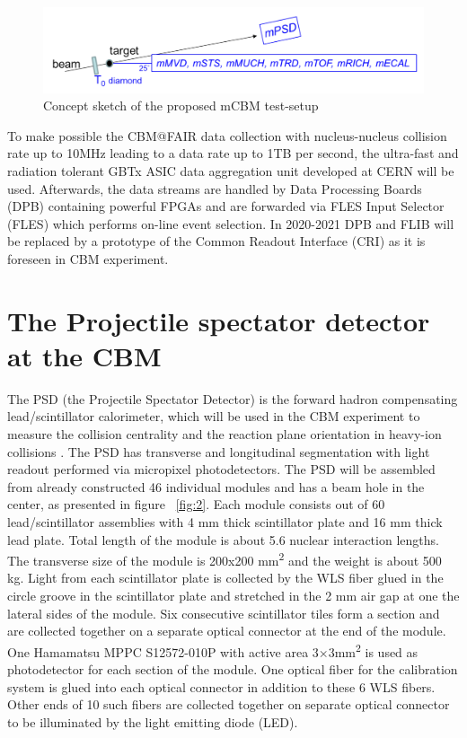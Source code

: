 \documentclass[a4paper,11pt]{article}
\begin{document}
\begin{figure}[htbp]
	\centering 
	\includegraphics[width=.8\textwidth]{mCBM_sketch.png}
	\caption{\label{fig:1} Concept sketch of the proposed mCBM test-setup}
\end{figure}

To make possible the CBM@FAIR data collection with nucleus-nucleus collision rate up to 10MHz leading to a data rate up to 1TB per second, the ultra-fast and radiation tolerant GBTx ASIC data aggregation unit developed at CERN will be used. Afterwards, the data streams are handled by Data Processing Boards (DPB) containing powerful FPGAs and are forwarded via FLES Input Selector (FLES) which performs on-line event selection. In 2020-2021 DPB and FLIB will be replaced by a prototype of the Common Readout Interface (CRI) as it is foreseen in CBM experiment.


\section{The Projectile spectator detector at the CBM}
The PSD (the Projectile Spectator Detector) is the forward hadron compensating lead/scintillator calorimeter, which will be used in the CBM experiment to measure the collision centrality and the reaction plane orientation in heavy-ion collisions \cite{3}. The PSD has transverse and longitudinal segmentation with light readout performed via micropixel photodetectors. 
The PSD will be assembled from already constructed 46 individual modules and has a beam hole in the center, as presented in figure ~\ref{fig:2}. Each module consists out of 60 lead/scintillator assemblies with 4 mm thick scintillator plate and 16 mm thick lead plate. Total length of the module is about 5.6 nuclear interaction lengths. The transverse size of the module is 200x200 mm\textsuperscript{2} and the weight is about 500 kg. Light from each scintillator plate is collected by the WLS fiber glued in the circle groove in the scintillator plate and stretched in the 2 mm air gap at one the lateral sides of the module. Six consecutive scintillator tiles form a section and are collected together on a separate optical connector at the end of the module. One Hamamatsu MPPC S12572-010P with active area 3×3mm\textsuperscript{2} is used as photodetector for each section of the module. One optical fiber for the calibration system is glued into each optical connector in addition to these 6 WLS fibers. Other ends of 10 such fibers are collected together on separate optical connector to be illuminated by the light emitting diode (LED). 
\end{document}
